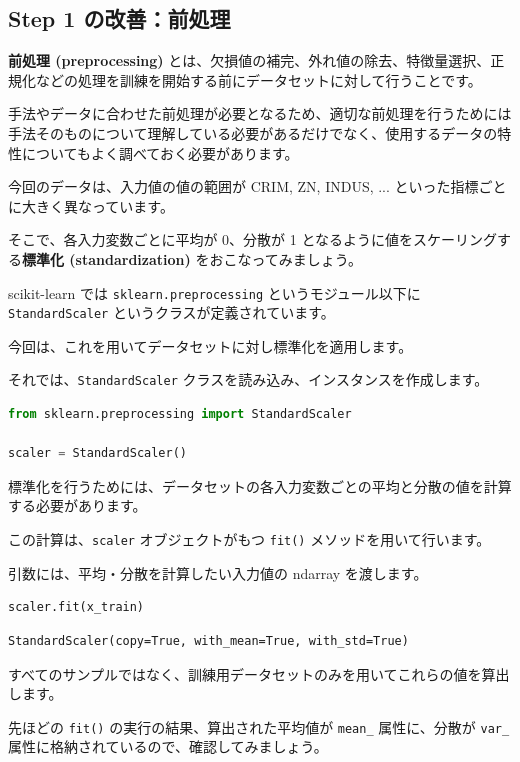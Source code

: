 \subsection{Step 1 の改善：前処理}


\textbf{前処理 (preprocessing)} とは、欠損値の補完、外れ値の除去、特徴量選択、正規化などの処理を訓練を開始する前にデータセットに対して行うことです。


手法やデータに合わせた前処理が必要となるため、適切な前処理を行うためには手法そのものについて理解している必要があるだけでなく、使用するデータの特性についてもよく調べておく必要があります。


今回のデータは、入力値の値の範囲が CRIM, ZN, INDUS, ... といった指標ごとに大きく異なっています。

そこで、各入力変数ごとに平均が 0、分散が 1 となるように値をスケーリングする\textbf{標準化 (standardization)} をおこなってみましょう。


scikit-learn では \texttt{sklearn.preprocessing} というモジュール以下に \texttt{StandardScaler} というクラスが定義されています。

今回は、これを用いてデータセットに対し標準化を適用します。

それでは、\texttt{StandardScaler} クラスを読み込み、インスタンスを作成します。


\begin{lstlisting}[style=codecell,language=Python]
from sklearn.preprocessing import StandardScaler

scaler = StandardScaler()
\end{lstlisting}

標準化を行うためには、データセットの各入力変数ごとの平均と分散の値を計算する必要があります。

この計算は、\texttt{scaler} オブジェクトがもつ \texttt{fit()} メソッドを用いて行います。

引数には、平均・分散を計算したい入力値の ndarray を渡します。


\begin{lstlisting}[style=codecell,language=Python]
scaler.fit(x_train)
\end{lstlisting}

\begin{lstlisting}[style=outputcell]
StandardScaler(copy=True, with_mean=True, with_std=True)
\end{lstlisting}

すべてのサンプルではなく、訓練用データセットのみを用いてこれらの値を算出します。

先ほどの \texttt{fit()} の実行の結果、算出された平均値が \texttt{mean\_} 属性に、分散が \texttt{var\_} 属性に格納されているので、確認してみましょう。


